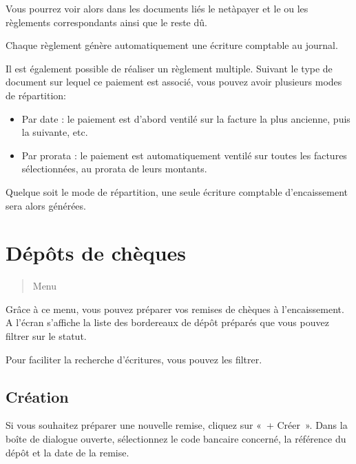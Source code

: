 \documentclass[a4paper,10pt,oneside,french]{sphinxmanual}
\begin{document}
\sphinxAtStartPar
Vous pourrez voir alors dans les documents liés le net\sphinxhyphen{}à\sphinxhyphen{}payer et le ou les règlements correspondants ainsi que le reste dû.

\sphinxAtStartPar
Chaque règlement génère automatiquement une écriture comptable au journal.

\sphinxAtStartPar
Il est également possible de réaliser un règlement multiple.
Suivant le type de document sur lequel ce paiement est associé, vous pouvez avoir plusieurs modes de répartition:
\begin{itemize}
\item {} 
\sphinxAtStartPar
Par date : le paiement est d’abord ventilé sur la facture la plus ancienne, puis la suivante, etc.

\item {} 
\sphinxAtStartPar
Par prorata : le paiement est automatiquement ventilé sur toutes les factures sélectionnées, au prorata de leurs montants.
\begin{quote}

\noindent{}
\end{quote}

\end{itemize}

\sphinxAtStartPar
Quelque soit le mode de répartition, une seule écriture comptable d’encaissement sera alors générées.


\section{Dépôts de chèques}
\label{\detokenize{payoff/deposit:depots-de-cheques}}\label{\detokenize{payoff/deposit::doc}}\begin{quote}

\sphinxAtStartPar
Menu 
\end{quote}

\sphinxAtStartPar
Grâce à ce menu, vous pouvez préparer vos remises de chèques à l’encaissement.
A l’écran s’affiche la liste des bordereaux de dépôt préparés que vous pouvez filtrer sur le statut.
\begin{quote}

\noindent{}
\end{quote}

\sphinxAtStartPar
Pour faciliter la recherche d’écritures, vous pouvez les filtrer.


\subsection{Création}
\label{\detokenize{payoff/deposit:creation}}
\sphinxAtStartPar
Si vous souhaitez préparer une nouvelle remise, cliquez sur « + Créer ».
Dans la boîte de dialogue ouverte, sélectionnez le code bancaire concerné, la référence du dépôt et la date de la remise.
\end{document}
